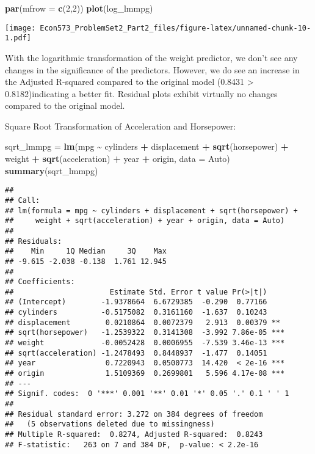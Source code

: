 \documentclass[
]{article}
\newenvironment{Shaded}{\begin{snugshade}}{\end{snugshade}}
\newcommand{\AttributeTok}[1]{\textcolor[rgb]{0.13,0.29,0.53}{#1}}
\newcommand{\DecValTok}[1]{\textcolor[rgb]{0.00,0.00,0.81}{#1}}
\newcommand{\FunctionTok}[1]{\textcolor[rgb]{0.13,0.29,0.53}{\textbf{#1}}}
\newcommand{\NormalTok}[1]{#1}
\newcommand{\OtherTok}[1]{\textcolor[rgb]{0.56,0.35,0.01}{#1}}
\newcommand{\SpecialCharTok}[1]{\textcolor[rgb]{0.81,0.36,0.00}{\textbf{#1}}}
\begin{document}
\begin{Shaded}
\begin{Highlighting}[]
\FunctionTok{par}\NormalTok{(}\AttributeTok{mfrow =} \FunctionTok{c}\NormalTok{(}\DecValTok{2}\NormalTok{,}\DecValTok{2}\NormalTok{))}
\FunctionTok{plot}\NormalTok{(log\_lmmpg)}
\end{Highlighting}
\end{Shaded}

\texttt{[image: Econ573\_ProblemSet2\_Part2\_files/figure-latex/unnamed-chunk-10-1.pdf]}

With the logarithmic transformation of the weight predictor, we don't
see any changes in the significance of the predictors. However, we do
see an increase in the Adjusted R-squared compared to the original model
(0.8431 \textgreater{} 0.8182)indicating a better fit. Residual plots
exhibit virtually no changes compared to the original model.

Square Root Transformation of Acceleration and Horsepower:

\begin{Shaded}
\begin{Highlighting}[]
\NormalTok{sqrt\_lmmpg }\OtherTok{=} \FunctionTok{lm}\NormalTok{(mpg }\SpecialCharTok{\textasciitilde{}}\NormalTok{ cylinders }\SpecialCharTok{+}\NormalTok{ displacement }\SpecialCharTok{+} \FunctionTok{sqrt}\NormalTok{(horsepower) }\SpecialCharTok{+}\NormalTok{ weight }\SpecialCharTok{+} \FunctionTok{sqrt}\NormalTok{(acceleration) }\SpecialCharTok{+}\NormalTok{ year }\SpecialCharTok{+}\NormalTok{ origin, }\AttributeTok{data =}\NormalTok{ Auto)}
\FunctionTok{summary}\NormalTok{(sqrt\_lmmpg)}
\end{Highlighting}
\end{Shaded}

\begin{verbatim}
## 
## Call:
## lm(formula = mpg ~ cylinders + displacement + sqrt(horsepower) + 
##     weight + sqrt(acceleration) + year + origin, data = Auto)
## 
## Residuals:
##    Min     1Q Median     3Q    Max 
## -9.615 -2.038 -0.138  1.761 12.945 
## 
## Coefficients:
##                      Estimate Std. Error t value Pr(>|t|)    
## (Intercept)        -1.9378664  6.6729385  -0.290  0.77166    
## cylinders          -0.5175082  0.3161160  -1.637  0.10243    
## displacement        0.0210864  0.0072379   2.913  0.00379 ** 
## sqrt(horsepower)   -1.2539322  0.3141308  -3.992 7.86e-05 ***
## weight             -0.0052428  0.0006955  -7.539 3.46e-13 ***
## sqrt(acceleration) -1.2478493  0.8448937  -1.477  0.14051    
## year                0.7220943  0.0500773  14.420  < 2e-16 ***
## origin              1.5109369  0.2699801   5.596 4.17e-08 ***
## ---
## Signif. codes:  0 '***' 0.001 '**' 0.01 '*' 0.05 '.' 0.1 ' ' 1
## 
## Residual standard error: 3.272 on 384 degrees of freedom
##   (5 observations deleted due to missingness)
## Multiple R-squared:  0.8274, Adjusted R-squared:  0.8243 
## F-statistic:   263 on 7 and 384 DF,  p-value: < 2.2e-16
\end{verbatim}
\end{document}
